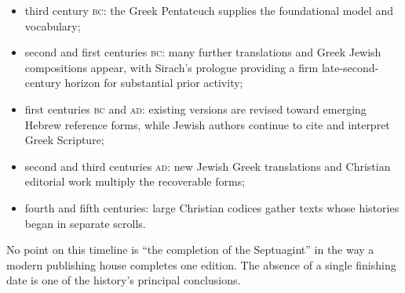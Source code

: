 \begin{itemize}
\item third century \textsc{bc}: the Greek Pentateuch supplies the foundational model and vocabulary;
\item second and first centuries \textsc{bc}: many further translations and Greek Jewish compositions appear, with Sirach's prologue providing a firm late-second-century horizon for substantial prior activity;
\item first centuries \textsc{bc} and \textsc{ad}: existing versions are revised toward emerging Hebrew reference forms, while Jewish authors continue to cite and interpret Greek Scripture;
\item second and third centuries \textsc{ad}: new Jewish Greek translations and Christian editorial work multiply the recoverable forms;
\item fourth and fifth centuries: large Christian codices gather texts whose histories began in separate scrolls.
\end{itemize}

No point on this timeline is “the completion of the Septuagint” in the way a modern publishing house completes one edition. The absence of a single finishing date is one of the history's principal conclusions.

